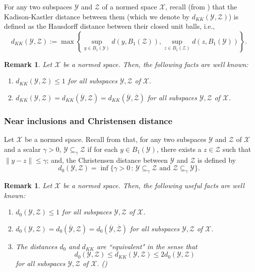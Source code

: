 \documentclass{amsart}
\numberwithin{equation}{section}
\newcommand{\mcal}{\mathcal}
\newcommand{\1}{\mathbf{1}}
\newtheorem{remark}[theorem]{Remark}
\begin{document}
For any two subspaces $\mcal{Y}$ and $\mcal{Z}$ of a normed space
$\mcal{X}$, recall (from \cite{KK}) that the Kadison-Kastler distance
between them (which we denote by $d_{KK}(\mcal{Y},\mcal{Z})$) is
defined as the Hausdorff distance between their closed unit balls,
i.e.,
\[
d_{KK}(\mcal{Y},\mcal{Z}) := \max\left\{\sup_{y \in B_1(\mcal{Y})} d(y, B_1(\mcal{Z})),
\sup_{z\in B_1(\mcal{Z})}d(z, B_1(\mcal{Y}))\right\}.
\]

\begin{remark}{\label{KK-facts}}
  Let $\mcal{X}$ be a normed space.  Then, the following facts are well known:
\begin{enumerate}
\item $d_{KK}(\mcal{Y},\mcal{Z}) \leq 1$ for all subspaces $\mcal{Y},
  \mcal{Z}$ of $\mcal{X}$.
 \item $d_{KK}(\mcal{Y},\mcal{Z}) = d_{KK}(\overline{\mcal{Y}},
   \mcal{Z})= d_{KK}(\overline{\mcal{Y}}, \overline{\mcal{Z}})$ for
   all subspaces $\mcal{Y},\mcal{Z}$ of $\mcal{X}$.


\end{enumerate}
\end{remark}

\subsubsection{Near inclusions and Christensen distance}

 Let $\mcal{X}$ be a normed space. Recall from \cite{Ch2} that, for
 any two subspaces $\mcal{Y}$ and $ \mcal{Z}$ of $\mcal{X}$ and a
 scalar $\gamma > 0$, $\mcal{Y} \subseteq_{\gamma} \mcal{Z}$ if for
 each $y \in B_1(\mcal{Y})$, there exists a $ z \in \mcal{Z}$ such
 that $\|y-z\| \leq \gamma$; and, the Christensen distance between
 $\mcal{Y}$ and $\mcal{Z}$ is defined by
   $$
    d_0(\mcal{Y},\mcal{Z}) = \inf\{\gamma > 0 \, : \, \mcal{Y} \subseteq_{\gamma}
    \mcal{Z} \text{ and } \mcal{Z} \subseteq_{\gamma} \mcal{Y}\}.
  $$  

\begin{remark}\label{d0-basics}
  Let $\mcal{X}$ be a normed space. Then, the following useful facts are
  well known:
      \begin{enumerate}
      \item $d_0(\mcal{Y}, \mcal{Z}) \leq 1$ for all subspaces $\mcal{Y}, \mcal{Z}$ of $\mcal{X}$.
\item $d_0(\mcal{Y},\mcal{Z}) = d_0(\overline{\mcal{Y}}, \mcal{Z})= d_0(\overline{\mcal{Y}},
  \overline{\mcal{Z}})$ for all subspaces $\mcal{Y}, \mcal{Z}$ of $\mcal{X}$.
  \item The distances $d_0$ and $d_{KK}$
    are ``equivalent" in the sense that
  \[
  d_0 (\mcal{Y},\mcal{Z}) \leq d_{KK}(\mcal{Y},\mcal{Z}) \leq 2 d_0(\mcal{Y},\mcal{Z})
  \]
  for all subspaces $\mcal{Y},\mcal{Z}$ of $\mcal{X}$. (\cite[Remark
    2.3]{Ch2}) \end{enumerate}
      \end{remark}
\end{document}
